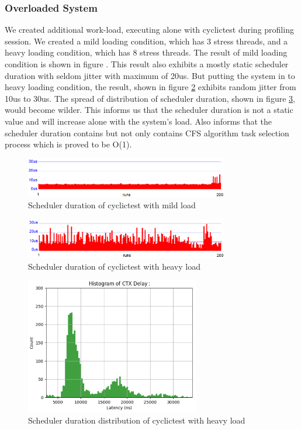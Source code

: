 \documentclass[conference]{IEEEtran}
\begin{document}
\subsubsection{Overloaded System}

    We created additional work-load, executing alone with cyclictest during profiling session. We created a mild loading
    condition, which has 3 stress threads, and a heavy loading condition, which has 8 stress threads. The result of mild
    loading condition is shown in figure \label{fig:sd_mild}. This result also exhibits a mostly static scheduler
    duration with seldom jitter with maximum of 20us. But putting the system in to heavy loading condition, the result,
    shown in figure \ref{fig:sd_heavy} exhibits random jitter from 10us to 30us. The spread of distribution of scheduler
    duration, shown in figure \ref{fig:sd_heavy_d}, would become wilder. This informs us that the scheduler duration is
    not a static value and will increase alone with the system's load. Also informs that the scheduler duration contains
    but not only contains CFS algorithm task selection process which is proved to be O(1).

    \begin{figure} \centering \includegraphics[width=3.5in]{img/sd-mild.png} \caption{Scheduler duration of cyclictest
    with mild load} \label{fig:sd_mild} \end{figure}

    \begin{figure} \centering \includegraphics[width=3.5in]{img/sd-heavy.png} \caption{Scheduler duration of cyclictest
    with heavy load} \label{fig:sd_heavy} \end{figure}

    \begin{figure} \centering \includegraphics[width=3in]{img/sd-heavy-d.png} \caption{Scheduler duration distribution
    of cyclictest with heavy load} \label{fig:sd_heavy_d} \end{figure}
\end{document}
